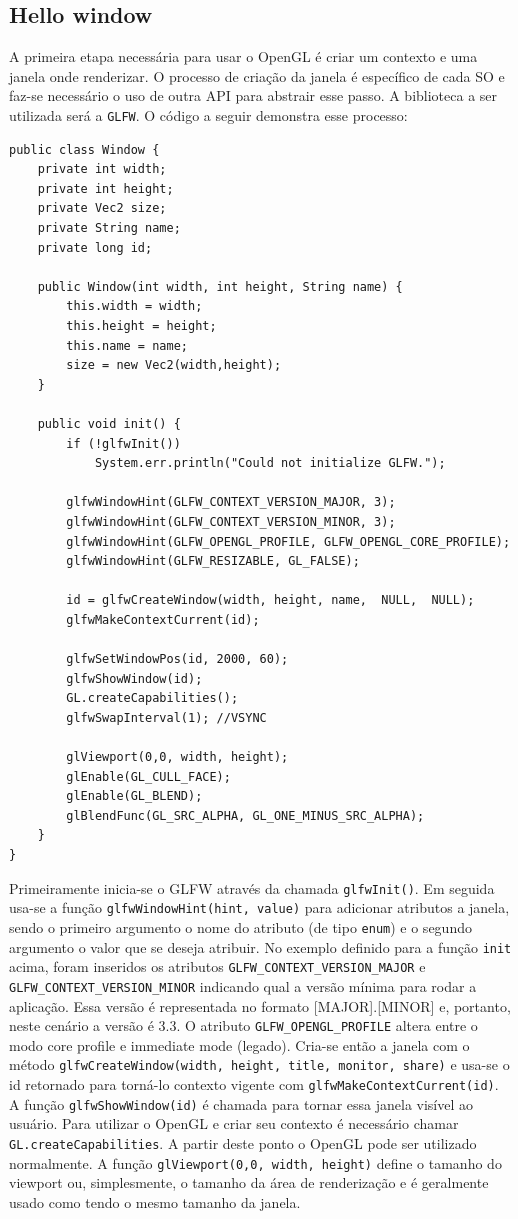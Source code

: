 \documentclass[12pt, 
openright, 
oneside, 
a4paper,    
brazil]{facom-ufu-abntex2}
\begin{document}
\subsection{Hello window}
A primeira etapa necessária para usar o OpenGL é criar um contexto e uma janela onde renderizar. O processo de criação da janela é específico de cada SO e faz-se necessário o uso de outra API para abstrair esse passo. A biblioteca a ser utilizada será a \texttt{GLFW}. O código a seguir demonstra esse processo:
\begin{lstlisting}[caption=Inicialização da janela e contexto OpenGL]
public class Window {
	private int width;
	private int height;
	private Vec2 size;
	private String name;
	private long id;
	
	public Window(int width, int height, String name) {
		this.width = width;
		this.height = height;
		this.name = name;
		size = new Vec2(width,height);
	}
	
	public void init() {
		if (!glfwInit()) 
			System.err.println("Could not initialize GLFW.");

		glfwWindowHint(GLFW_CONTEXT_VERSION_MAJOR, 3);
		glfwWindowHint(GLFW_CONTEXT_VERSION_MINOR, 3);
		glfwWindowHint(GLFW_OPENGL_PROFILE, GLFW_OPENGL_CORE_PROFILE);
		glfwWindowHint(GLFW_RESIZABLE, GL_FALSE);

		id = glfwCreateWindow(width, height, name,  NULL,  NULL);
		glfwMakeContextCurrent(id);

		glfwSetWindowPos(id, 2000, 60);
		glfwShowWindow(id);
		GL.createCapabilities();
		glfwSwapInterval(1); //VSYNC

		glViewport(0,0, width, height);
		glEnable(GL_CULL_FACE);
		glEnable(GL_BLEND);
		glBlendFunc(GL_SRC_ALPHA, GL_ONE_MINUS_SRC_ALPHA);
	}
}
\end{lstlisting}
Primeiramente inicia-se o GLFW através da chamada \texttt{glfwInit()}. Em seguida usa-se a função \texttt{glfwWindowHint(hint, value)} para adicionar atributos a janela, sendo o primeiro argumento o nome do atributo (de tipo \texttt{enum}) e o segundo argumento o valor que se deseja atribuir. No exemplo definido para a função \texttt{init} acima, foram inseridos os atributos \texttt{GLFW_CONTEXT_VERSION_MAJOR} e  \texttt{GLFW_CONTEXT_VERSION_MINOR} indicando qual a versão mínima para rodar a aplicação. Essa versão é representada no formato [MAJOR].[MINOR] e, portanto, neste cenário a versão é 3.3. O atributo \texttt{GLFW_OPENGL_PROFILE} altera entre o modo core profile e immediate mode (legado). Cria-se então a janela com o método \texttt{glfwCreateWindow(width, height, title, monitor, share)} e usa-se o id retornado para torná-lo contexto vigente com
\linebreak \texttt{glfwMakeContextCurrent(id)}. A função \texttt{glfwShowWindow(id)} é chamada para tornar essa janela visível ao usuário. Para utilizar o OpenGL e criar seu contexto é necessário chamar \texttt{GL.createCapabilities}. A partir deste ponto o OpenGL pode ser utilizado normalmente. A função \texttt{glViewport(0,0, width, height)} define o tamanho do viewport ou, simplesmente, o tamanho da área de renderização e é geralmente usado como tendo o mesmo tamanho da janela.
\end{document}
